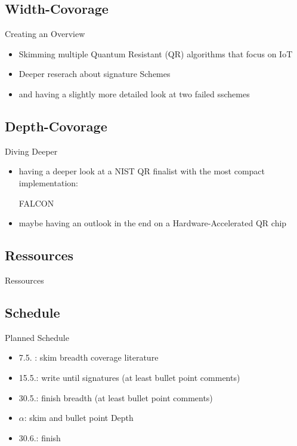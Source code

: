 \documentclass[ucs,10pt]{beamer}
\begin{document}
\subsection{Width-Covorage}
\begin{frame}{Creating an Overview}
  \begin{itemize}
    \item Skimming multiple Quantum Resistant (QR) algorithms \cite{QR_algs,PQClean-GH} that focus on IoT \cite{QR_comparison,Energy_comp,QR_Iot_Lattice,QR_IoT,QR_IoT_Energy} 
    \item Deeper reserach about signature Schemes \cite{QR_sigs}
    \item and having a slightly more detailed look at two failed sschemes \cite{WalnutDSA,WalnutDSA_broken,qtesla,qtesla_masked}
    
  \end{itemize}
\end{frame}

\subsection{Depth-Covorage}
\begin{frame}{Diving Deeper}
  \begin{itemize}
    \item  having a deeper look at a NIST QR finalist with the most compact implementation:

    FALCON \cite{falcon_and_dilithium,falcon_micro_impl,bearz}
   
    \item  maybe having an outlook in the end on a Hardware-Accelerated QR chip \cite{IoT_ASIC} 
  \end{itemize}

\end{frame}

\subsection{Ressources}
\begin{frame}[allowframebreaks]{Ressources}
  
  
\end{frame}

\subsection{Schedule}
\begin{frame}{Planned Schedule}
\begin{itemize}
  \item 7.5. : skim breadth coverage literature
  \item 15.5.: write until signatures (at least bullet point comments)
  \item 30.5.: finish breadth (at least bullet point comments)
  \item $\alpha$: skim and bullet point Depth
  \item 30.6.: finish
\end{itemize}
\end{frame}
\end{document}
